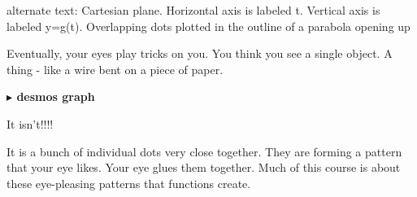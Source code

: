 \documentclass{ximera}
\begin{document}
\textcolor{gray!90}{alternate text: Cartesian plane. Horizontal axis is labeled t. Vertical axis is labeled y=g(t). Overlapping dots plotted in the outline of a parabola opening up}




Eventually, your eyes play tricks on you.  You think you see a single object.  A thing - like a wire bent on a piece of paper.



\begin{image}
\end{image}







\begin{onlineOnly}
\textbf{\textcolor{blue!55!black}{$\blacktriangleright$ desmos graph}} 
\begin{center}
\end{center}
\end{onlineOnly}







\large{It isn't!!!!}




It is a bunch of individual dots very close together. They are forming a pattern that your eye likes. Your eye glues them together.  Much of this course is about these eye-pleasing patterns that functions create.
\end{document}
